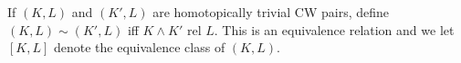 If $(K, L)$ and $(K', L)$ are homotopically trivial CW pairs, define $(K, L) \sim (K', L)$ iff $K \wedge K'$ rel $L$. This is an equivalence relation and we let $[K, L]$ denote the equivalence class of $(K, L)$.
